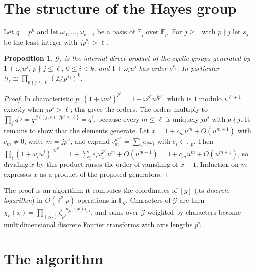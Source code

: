 \documentclass[11pt,a4paper]{article}
\newtheorem{proposition}[theorem]{Proposition}
\theoremstyle{definition}
\theoremstyle{remark}
\newcommand{\Fq}{\mathbb{F}_q}
\newcommand{\cG}{\mathcal{G}}
\begin{document}
\section{The structure of the Hayes group}\label{sec:group}

Let $q=p^k$ and let $\omega_0,\dots,\omega_{k-1}$ be a basis of $\Fq$ over $\mathbb F_p$. For $j\ge1$
with $p\nmid j$ let $s_j$ be the least integer with $jp^{s_j}>\ell$.

\begin{proposition}\label{prop:basis}
$\cG_\ell$ is the internal direct product of the cyclic groups generated by $1+\omega_iu^j$,
$p\nmid j\le\ell$, $0\le i<k$, and $1+\omega_iu^j$ has order $p^{s_j}$. In particular
$\cG_\ell\cong\prod_{p\nmid j\le\ell}(\mathbb Z/p^{s_j})^k$.
\end{proposition}

\begin{proof}
In characteristic $p$, $(1+\omega u^j)^{p^s}=1+\omega^{p^s}u^{jp^s}$, which is $1$ modulo
$u^{\ell+1}$ exactly when $jp^s>\ell$; this gives the orders. The orders multiply to
$\prod_jq^{s_j}=q^{\#\{(j,s):\,jp^s\le\ell\}}=q^\ell$, because every $m\le\ell$ is uniquely $jp^s$
with $p\nmid j$. It remains to show that the elements generate. Let $x=1+c_mu^m+O(u^{m+1})$ with
$c_m\ne0$, write $m=jp^a$, and expand $c_m^{p^{-a}}=\sum_ie_i\omega_i$ with $e_i\in\mathbb F_p$. Then
$\prod_i(1+\omega_iu^j)^{e_ip^a}=1+\sum_ie_i\omega_i^{p^a}u^m+O(u^{m+1})=1+c_mu^m+O(u^{m+1})$, so
dividing $x$ by this product raises the order of vanishing of $x-1$. Induction on $m$ expresses
$x$ as a product of the proposed generators.
\end{proof}

The proof is an algorithm: it computes the coordinates of $[g]$ (its \emph{discrete logarithm})
in $O(\ell^2p)$ operations in $\Fq$. Characters of $\cG$ are then
$\chi_b(x)=\prod_{(j,i)}\zeta_{p^{s_j}}^{-a_{j,i}(x)b_{j,i}}$, and sums over $\cG$ weighted by
characters become multidimensional discrete Fourier transforms with axis lengths $p^{s_j}$.

\section{The algorithm}\label{sec:algorithm}
\end{document}

